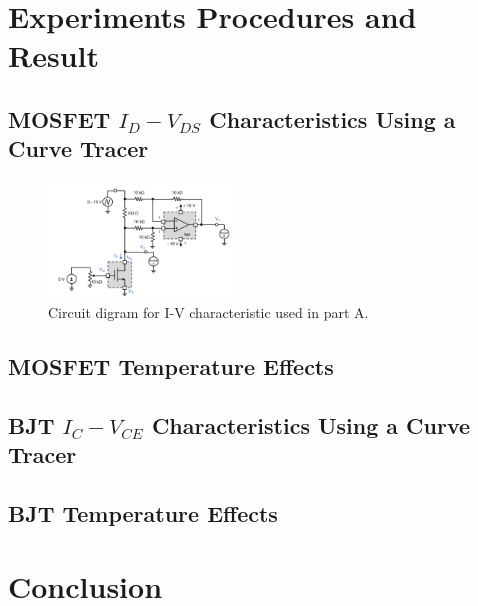 \documentclass[journal]{IEEEtran}
\begin{document}
\section{Experiments Procedures and Result}
\subsection{MOSFET $I_{D}-V_{DS}$ Characteristics Using a Curve Tracer}
\begin{figure}[h]
  \centering
  \includegraphics[width=0.45\textwidth]{images/1.png}
  \caption{Circuit digram for I-V characteristic used in part A.}
  \label{fig-1}
\end{figure}
\subsection{MOSFET Temperature Effects}
\subsection{BJT $I_{C}-V_{CE}$ Characteristics Using a Curve Tracer}
\subsection{BJT Temperature Effects}
\section{Conclusion}
\end{document}

